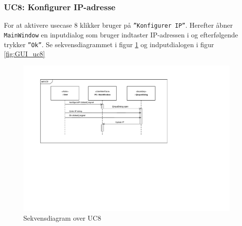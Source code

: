 \subsubsection{UC8: Konfigurer IP-adresse}
For at aktivere usecase 8 klikker bruger på \texttt{''Konfigurer IP''}. Herefter åbner \texttt{MainWindow} en inputdialog som bruger indtaster IP-adressen i og efterfølgende trykker \texttt{''Ok''}. Se sekvensdiagrammet i figur \ref{fig:cd_uc8} og indputdialogen i figur \ref{fig:GUI_uc8} 

\begin{figure}[H]
\centering
\includegraphics[width=\textwidth* 2/3,height=\textwidth* 4/10 ]{../fig/diagrammer/pc/sd_uc8.pdf}
\caption{Sekvensdiagram over UC8}
\label{fig:cd_uc8}
\end{figure}

